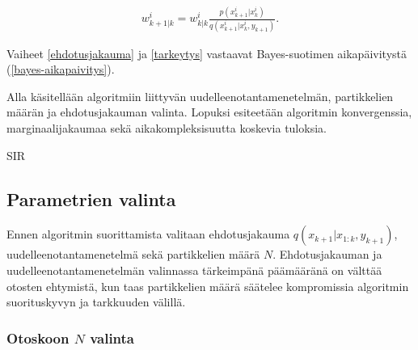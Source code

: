 \documentclass[
  12pt,
  a4paper, twoside]{book}
\begin{document}
\begin{align}\label{tarkeytys} w_{k+1|k}^i=w_{k|k}^i\frac{p(x_{k+1}^i|x_k^i)}{q(x_{k+1}^i|x_k^i,y_{k+1})}.
\end{align}

\noindent Vaiheet \ref{ehdotusjakauma} ja \ref{tarkeytys} vastaavat Bayes-suotimen aikapäivitystä (\ref{bayes-aikapaivitys}).

Alla käsitellään algoritmiin liittyvän uudelleenotantamenetelmän, partikkelien määrän ja ehdotusjakauman valinta. Lopuksi esiteetään algoritmin konvergenssia, marginaalijakaumaa sekä aikakompleksisuutta koskevia tuloksia.

\begin{algorithm}[H]
\label{sir}
\DontPrintSemicolon
\SetAlgoShortEnd
{}
\caption{SIR}
\end{algorithm}

\subsection{Parametrien valinta}

Ennen algoritmin suorittamista valitaan ehdotusjakauma \(q(x_{k+1}|x_{1:k},y_{k+1})\), uudelleenotantamenetelmä sekä partikkelien määrä \(N\). Ehdotusjakauman ja uudelleenotantamenetelmän valinnassa tärkeimpänä päämääränä on välttää otosten ehtymistä, kun taas partikkelien määrä säätelee kompromissia algoritmin suorituskyvyn ja tarkkuuden välillä.

\subsubsection{Otoskoon $N$ valinta}
\end{document}
